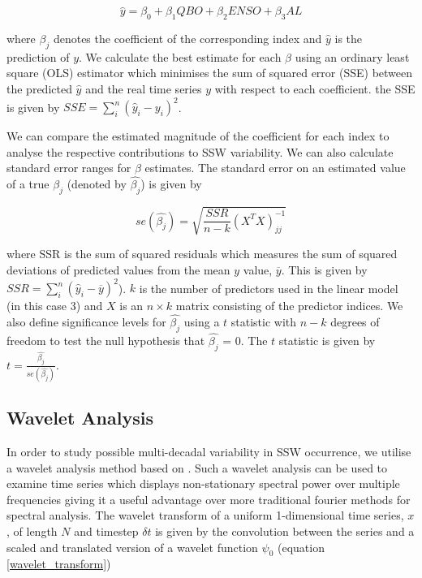 \documentclass[wcd, manuscript]{copernicus}
\begin{document}
\begin{equation} \label{regression}
\hat{y} = \beta_0 + \beta_{1}QBO + \beta_{2}ENSO + \beta_{3}AL
\end{equation}

where $\beta_j$ denotes the coefficient of the corresponding index and $\hat{y}$ is the prediction of $y$. We calculate the best estimate for each $\beta$ using an ordinary least square (OLS) estimator which minimises the sum of squared error (SSE) between the predicted $\hat{y}$ and the real time series $y$ with respect to each coefficient. the SSE is given by $SSE = \sum_i^n{(\hat{y}_i - y_i)^2}$.

We can compare the estimated magnitude of the coefficient for each index to analyse the respective contributions to SSW variability. We can also calculate standard error ranges for $\beta$ estimates. The standard error on an estimated value of a true $\beta_j$ (denoted by $\hat{\beta_j}$) is given by 

\begin{equation} \label{regression}
se(\hat{\beta_j}) = \sqrt{\frac{SSR}{n - k} (X^TX)^{-1}_{jj}}
\end{equation}

where SSR is the sum of squared residuals which measures the sum of squared deviations of predicted values from the mean $y$ value, $\overline{y}$. This is given by $SSR = \sum_i^n{(\hat{y}_i - \overline{y})^2}$). $k$ is the number of predictors used in the linear model (in this case 3) and $X$ is an $n \times k$ matrix consisting of the predictor indices. We also define significance levels for $\hat{\beta_j}$ using a $t$ statistic with $n-k$ degrees of freedom to test the null hypothesis that $\hat{\beta_j}$ = 0. The $t$ statistic is given by $t = \frac{\hat{\beta_j}}{se(\hat{\beta_j})}$.

\subsection{Wavelet Analysis}
\label{wavelet_sec}
In order to study possible multi-decadal variability in SSW occurrence, we utilise a wavelet analysis method based on \cite{Torrence1998}. Such a wavelet analysis can be used to examine time series which displays non-stationary spectral power over multiple frequencies \citep{Daubechies} giving it a useful advantage over more traditional fourier methods for spectral analysis. The wavelet transform of a uniform 1-dimensional time series, $x$, of length $N$ and timestep $\delta t$ is given by the convolution between the series and a scaled and translated version of a wavelet function $\psi_0$ (equation \ref{wavelet_transform})
\end{document}
